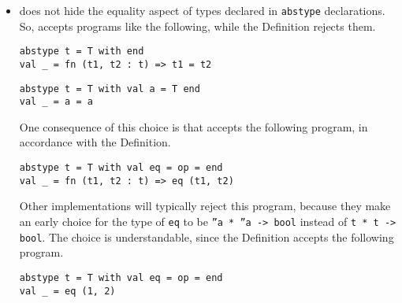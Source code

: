 \begin{itemize}
\item
{\mlton} does not hide the equality aspect of types declared in
{\tt abstype} declarations.  So, {\mlton} accepts programs like the
following, while the Definition rejects them.
\begin{verbatim}
abstype t = T with end
val _ = fn (t1, t2 : t) => t1 = t2
\end{verbatim}

\begin{verbatim}
abstype t = T with val a = T end
val _ = a = a
\end{verbatim}

One consequence of this choice is that {\mlton} accepts the following
program, in accordance with the Definition.
\begin{verbatim}
abstype t = T with val eq = op = end
val _ = fn (t1, t2 : t) => eq (t1, t2)
\end{verbatim}
Other implementations will typically reject this program, because they
make an early choice for the type of {\tt eq} to be {\tt ''a * ''a ->
bool} instead of {\tt t * t -> bool}.  The choice is understandable,
since the Definition accepts the following program.
\begin{verbatim}
abstype t = T with val eq = op = end
val _ = eq (1, 2)
\end{verbatim}

\end{itemize}
